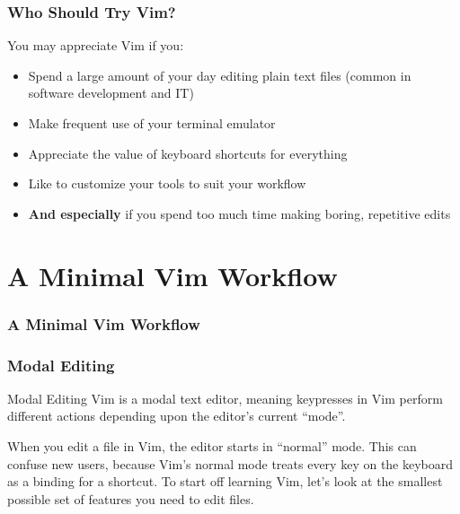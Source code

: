 \documentclass{beamer}
\begin{document}
\begin{frame}[fragile]
    \frametitle{Who Should Try Vim?}
    \centerline{\large You may appreciate Vim if you:}
    \vspace{0.5cm}
    \begin{itemize}
	\item Spend a large amount of your day editing plain text files (common in software development and IT)
	\item Make frequent use of your terminal emulator
	\item Appreciate the value of keyboard shortcuts for everything
	\item Like to customize your tools to suit your workflow
	\item \textbf{And especially} if you spend too much time making boring, repetitive edits
    \end{itemize}
\end{frame}

\section{A Minimal Vim Workflow}

\begin{frame}[fragile]
    \frametitle{A Minimal Vim Workflow}
    \tableofcontents[currentsection]
\end{frame}

\begin{frame}[fragile]
    \frametitle{Modal Editing}
    \small
    \begin{block}{Modal Editing}
	Vim is a modal text editor, meaning keypresses in Vim perform different actions depending upon the editor's current \enquote{mode}.\\
    \end{block}
    When you edit a file in Vim, the editor starts in \enquote{normal} mode. This can confuse new users, because Vim's normal mode treats every key on the keyboard as a binding for a shortcut. To start off learning Vim, let's look at the smallest possible set of features you need to edit files.
\end{frame}
\end{document}
